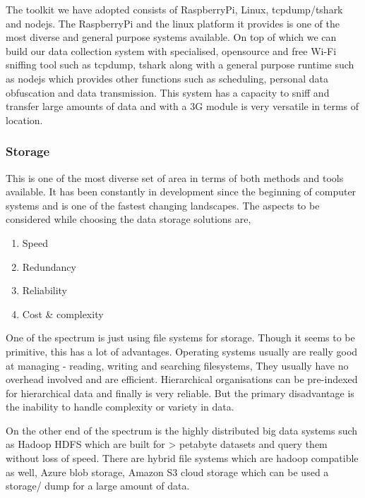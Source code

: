 The toolkit we have adopted consists of RaspberryPi, Linux, tcpdump/tshark and nodejs.
The RaspberryPi and the linux platform it provides is one of the most diverse and general purpose systems available.
On top of which we can build our data collection system with specialised, opensource and free Wi-Fi sniffing tool such as tcpdump, tshark along with a general purpose runtime such as nodejs which provides other functions such as scheduling, personal data obfuscation and data transmission.
This system has a capacity to sniff and transfer large amounts of data and with a 3G module is very versatile in terms of location.

\subsubsection{Storage}

This is one of the most diverse set of area in terms of both methods and tools available.
It has been constantly in development since the beginning of computer systems and is one of the fastest changing landscapes.
The aspects to be considered while choosing the data storage solutions are,

\begin{enumerate}
    \item Speed
    \item Redundancy
    \item Reliability
    \item Cost \& complexity
\end{enumerate}

One of the spectrum is just using file systems for storage.
Though it seems to be primitive, this has a lot of advantages.
Operating systems usually are really good at managing - reading, writing and searching filesystems, They usually have no overhead involved and are efficient.
Hierarchical organisations can be pre-indexed for hierarchical data and finally is very reliable.
But the primary disadvantage is the inability to handle complexity or variety in data.

On the other end of the spectrum is the highly distributed big data systems such as Hadoop HDFS which are built for > petabyte datasets and query them without loss of speed.
There are hybrid file systems which are hadoop compatible as well, Azure blob storage, Amazon S3 cloud storage which can be used a storage/ dump for a large amount of data.

